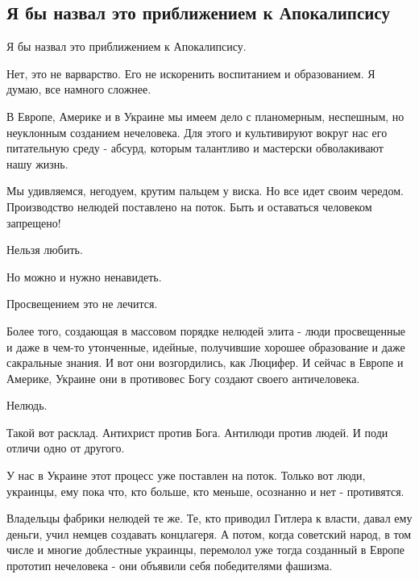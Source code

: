  
 
 
 
 
\subsection{Я бы назвал это приближением к Апокалипсису}

Я бы назвал это приближением к Апокалипсису.

Нет, это не варварство. Его не искоренить воспитанием и образованием. Я думаю, все намного сложнее.

В Европе, Америке и в Украине мы имеем дело с планомерным, неспешным, но
неуклонным созданием нечеловека. Для этого и культивируют вокруг нас его
питательную среду - абсурд, которым талантливо и мастерски обволакивают нашу
жизнь.

Мы удивляемся, негодуем, крутим пальцем у виска. Но все идет своим чередом.
Производство нелюдей поставлено на поток. Быть и оставаться человеком
запрещено!

Нельзя любить.

Но можно и нужно ненавидеть.

Просвещением это не лечится.

Более того, создающая в массовом порядке нелюдей элита - люди просвещенные и
даже в чем-то утонченные, идейные, получившие хорошее образование и даже
сакральные знания. И вот они возгордились, как Люцифер. И сейчас в Европе и
Америке, Украине они в противовес Богу создают своего античеловека.

Нелюдь.

Такой вот расклад. Антихрист против Бога. Антилюди против людей. И поди отличи
одно от другого.

У нас в Украине этот процесс уже поставлен на поток. Только вот люди, украинцы,
ему пока что, кто больше, кто меньше, осознанно и нет - противятся.

Владельцы фабрики нелюдей те же. Те, кто приводил Гитлера к власти, давал ему
деньги, учил немцев создавать концлагеря. А потом, когда советский народ, в том
числе и многие доблестные украинцы, перемолол уже тогда созданный в Европе
прототип нечеловека - они объявили себя победителями фашизма.

